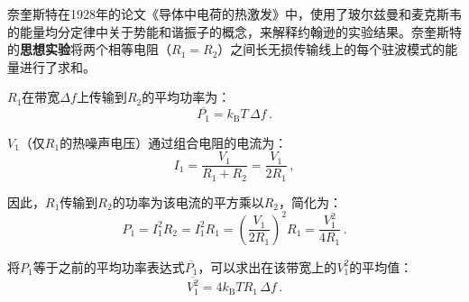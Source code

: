 \documentclass[dvipsnames, svgnames,a4paper,11pt]{article}
\begin{document}
\begin{enumerate}
\begin{enumerate}
				
			
			奈奎斯特在1928年的论文《导体中电荷的热激发》中，使用了玻尔兹曼和麦克斯韦的能量均分定律中关于势能和谐振子的概念，来解释约翰逊的实验结果。奈奎斯特的\textbf{思想实验}将两个相等电阻（$R_1 = R_2$）之间长无损传输线上的每个驻波模式的能量进行了求和。
			
			$R_1$在带宽$\Delta f$上传输到$R_2$的平均功率为：
			\begin{equation*}
				\overline{P_1} = k_\text{B} T \, \Delta f \, .
			\end{equation*}
			
			$V_1$（仅$R_1$的热噪声电压）通过组合电阻的电流为：
			\begin{equation*}
				I_1 = \frac{V_1}{R_1 + R_2} = \frac{V_1}{2R_1} \, ,
			\end{equation*}
			
			因此，$R_1$传输到$R_2$的功率为该电流的平方乘以$R_2$，简化为：
			\begin{equation*}
				P_1 = I_1^2 R_2 = I_1^2 R_1 = \left( \frac{V_1}{2R_1} \right)^2 R_1 = \frac{V_1^2}{4R_1} \, .
			\end{equation*}
			
			将$P_1$等于之前的平均功率表达式$\overline{P_1}$，可以求出在该带宽上的$V_1^2$的平均值：
			\begin{equation*}
				\overline{V_1^2} = 4 k_\text{B} T R_1 \, \Delta f \, .
			\end{equation*}
			

\end{enumerate}
\end{enumerate}
\end{document}
